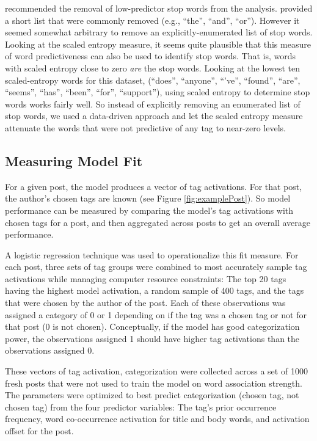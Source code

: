 \documentclass[10pt,letterpaper]{article}
\begin{document}
 recommended the removal of low-predictor stop words from the analysis.
\citeauthor{Bird2009} provided a short list that were commonly removed (e.g., ``the'', ``and'', ``or'').
However it seemed somewhat arbitrary to remove an explicitly-enumerated list of stop words.
Looking at the scaled entropy measure, it seems quite plausible that this measure of word predictiveness can also be used to identify stop words.
That is, words with scaled entropy close to zero \emph{are} the stop words.
Looking at the lowest ten scaled-entropy words for this dataset, (``does'', ``anyone'', ``'ve'', ``found'', ``are'', ``seems'', ``has'', ``been'', ``for'', ``support''),
using scaled entropy to determine stop words works fairly well.
So instead of explicitly removing an enumerated list of stop words, we used a data-driven approach and let the scaled entropy measure attenuate the words that were not predictive of any tag to near-zero levels.

\subsection{Measuring Model Fit}

For a given post, the model produces a vector of tag activations.
For that post, the author's chosen tags are known (see Figure \ref{fig:examplePost}).
So model performance can be measured by comparing the model's tag activations with chosen tags for a post, and then aggregated across posts to get an overall average performance.

A logistic regression technique was used to operationalize this fit measure.
For each post, three sets of tag groups were combined to most accurately sample tag activations while managing computer resource constraints:
The top 20 tags having the highest model activation, a random sample of 400 tags, and the tags that were chosen by the author of the post.
Each of these observations was assigned a category of 0 or 1 depending on if the tag was a chosen tag or not for that post (0 is not chosen).
Conceptually, if the model has good categorization power, the observations assigned 1 should have higher tag activations than the observations assigned 0.

These vectors of tag activation, categorization were collected across a set of \num{1000} fresh posts that were not used to train the model on word association strength.
The parameters were optimized to best predict categorization (chosen tag, not chosen tag) from the four predictor variables:
The tag's prior occurrence frequency, word co-occurrence activation for title and body words, and activation offset for the post.
\end{document}
